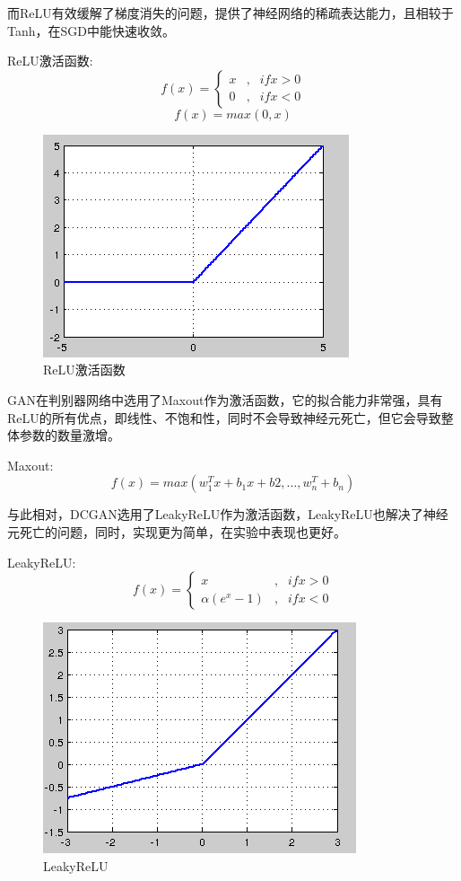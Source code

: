\documentclass[hyperref, a4paper]{ctexart}
\begin{document}
而ReLU有效缓解了梯度消失的问题，提供了神经网络的稀疏表达能力，且相较于Tanh，在SGD中能快速收敛。

ReLU激活函数: \[ f(x)=\left\{
\begin{aligned}
x & ,& if x>0 \\
0 & , & if x < 0 
\end{aligned}
\right.
\] \[f(x)=max(0,x)\]

\begin{figure}
\centering
\includegraphics{./15.jpg}
\caption{ReLU激活函数}
\end{figure}

GAN在判别器网络中选用了Maxout作为激活函数，它的拟合能力非常强，具有ReLU的所有优点，即线性、不饱和性，同时不会导致神经元死亡，但它会导致整体参数的数量激增。

Maxout:\[f(x)=max(w^T_1x +b_1x+b2,…,w_n^T+b_n)\]

与此相对，DCGAN选用了LeakyReLU作为激活函数，LeakyReLU也解决了神经元死亡的问题，同时，实现更为简单，在实验中表现也更好。

LeakyReLU:\[ f(x)=\left\{
\begin{aligned}
x & ,& if x>0 \\
\alpha(e^x-1) & , & if x < 0 
\end{aligned}
\right.
\]

\begin{figure}
\centering
\includegraphics{./18.jpg}
\caption{LeakyReLU}
\end{figure}
\end{document}
